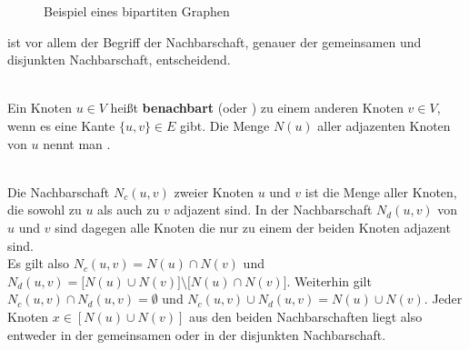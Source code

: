 \begin{figure}
\centering
{}
\caption{Beispiel eines bipartiten Graphen}
\label{fig:beispiel_bipartit}
\end{figure}
 ist vor allem der Begriff der Nachbarschaft, genauer der gemeinsamen und disjunkten 
Nachbarschaft, entscheidend.
\begin{definition}[Nachbarschaft]~\\
Ein Knoten $u \in V$ heißt \textbf{benachbart} (oder ) zu einem 
anderen Knoten $v \in V$, wenn es eine Kante $\{u,v\} \in E $ gibt. Die Menge $N(u)$ aller adjazenten Knoten
von $u$ nennt man .
\end{definition}
\begin{definition}~\\
Die  Nachbarschaft $N_{c}(u,v)$ zweier Knoten $u$ und $v$ ist die Menge aller Knoten, die sowohl
zu $u$ als auch zu $v$ adjazent sind. In der  Nachbarschaft $N_{d}(u,v)$ von $u$ und $v$ sind dagegen 
alle Knoten die nur zu einem der beiden Knoten adjazent sind. \\
Es gilt also $N_{c}(u,v) = N(u) \cap N(v)$ und $N_{d}(u,v) = \big[N(u) \cup N(v)\big]\setminus \big[N(u) \cap N(v) \big]$.{}
Weiterhin gilt $N_{c}(u,v) \cap N_{d}(u,v) = \emptyset$ und $N_{c}(u,v) \cup N_{d}(u,v) = N(u) \cup N(v)$.
Jeder Knoten $x\in \left[N(u) \cup N(v)\right]$ aus den beiden Nachbarschaften liegt also entweder
in der gemeinsamen oder in der disjunkten Nachbarschaft.
\label{def:common_disjoint}
\end{definition}
